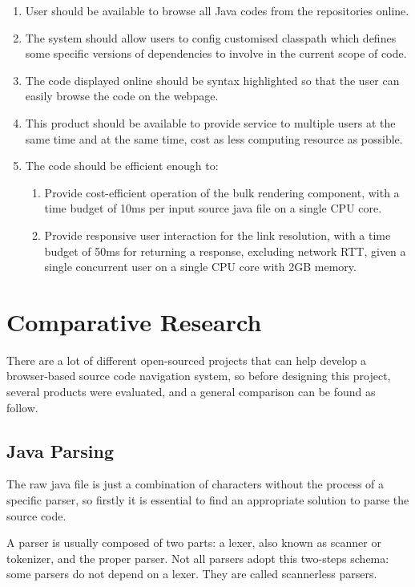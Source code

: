 \documentclass[runningheads]{llncs}
\begin{document}
\begin{enumerate}
	\item User should be available to browse all Java codes from the repositories online.
	\item The system should allow users to config customised classpath which defines some specific versions of dependencies to involve in the current scope of code. 
	\item The code displayed online should be syntax highlighted so that the user can easily browse the code on the webpage.
	\item This product should be available to provide service to multiple users at the same time and at the same time, cost as less computing resource as possible.
	\item The code should be efficient enough to: 
	\begin{enumerate}
		\item Provide cost-efficient operation of the bulk rendering component, with a time budget of 10ms per input source java file on a single CPU core.
		\item Provide responsive user interaction for the link resolution, with a time budget of 50ms for returning a response, excluding network RTT, given a single concurrent user on a single CPU core with 2GB memory.
	\end{enumerate}
\end{enumerate}


\section{Comparative Research}

There are a lot of different open-sourced projects that can help develop a browser-based source code navigation system, so before designing this project, several products were evaluated, and a general comparison can be found as follow.

\subsection{Java Parsing}

The raw java file is just a combination of characters without the process of a specific parser, so firstly it is essential to find an appropriate solution to parse the source code. 

A parser is usually composed of two parts: a lexer, also known as scanner or tokenizer, and the proper parser. Not all parsers adopt this two-steps schema: some parsers do not depend on a lexer. They are called scannerless parsers.\cite{parsing-in-java}
\end{document}
